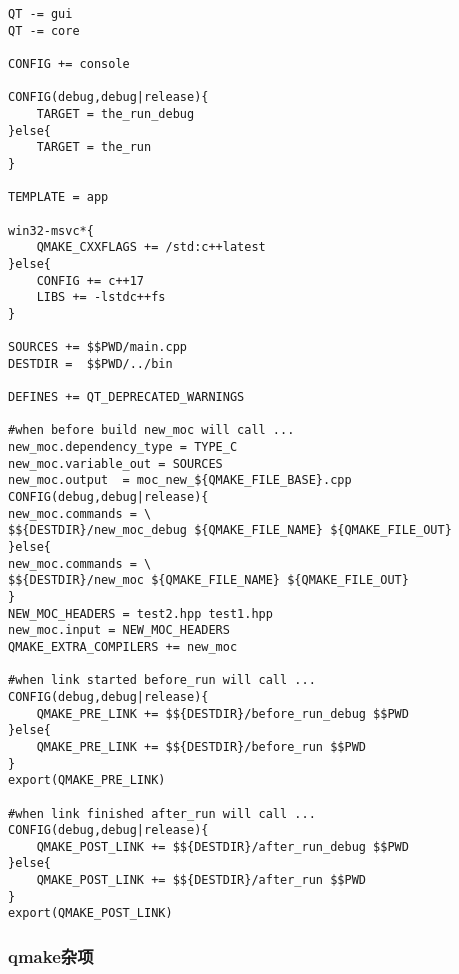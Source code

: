\begin{lstlisting}[label=f000005, 
caption=GoodLuck,
title=\lstlistingname\ \thelstlisting
]
QT -= gui
QT -= core

CONFIG += console

CONFIG(debug,debug|release){
    TARGET = the_run_debug
}else{
    TARGET = the_run
}

TEMPLATE = app

win32-msvc*{
    QMAKE_CXXFLAGS += /std:c++latest
}else{
    CONFIG += c++17
    LIBS += -lstdc++fs
}

SOURCES += $$PWD/main.cpp
DESTDIR =  $$PWD/../bin

DEFINES += QT_DEPRECATED_WARNINGS

#when before build new_moc will call ...
new_moc.dependency_type = TYPE_C
new_moc.variable_out = SOURCES
new_moc.output  = moc_new_${QMAKE_FILE_BASE}.cpp
CONFIG(debug,debug|release){
new_moc.commands = \
$${DESTDIR}/new_moc_debug ${QMAKE_FILE_NAME} ${QMAKE_FILE_OUT}
}else{
new_moc.commands = \
$${DESTDIR}/new_moc ${QMAKE_FILE_NAME} ${QMAKE_FILE_OUT}
}
NEW_MOC_HEADERS = test2.hpp test1.hpp
new_moc.input = NEW_MOC_HEADERS
QMAKE_EXTRA_COMPILERS += new_moc

#when link started before_run will call ...
CONFIG(debug,debug|release){
    QMAKE_PRE_LINK += $${DESTDIR}/before_run_debug $$PWD
}else{
    QMAKE_PRE_LINK += $${DESTDIR}/before_run $$PWD
}
export(QMAKE_PRE_LINK)

#when link finished after_run will call ...
CONFIG(debug,debug|release){
    QMAKE_POST_LINK += $${DESTDIR}/after_run_debug $$PWD
}else{
    QMAKE_POST_LINK += $${DESTDIR}/after_run $$PWD
}
export(QMAKE_POST_LINK)
\end{lstlisting}          %



\subsubsection{
qmake杂项
}\label{ss000910}













